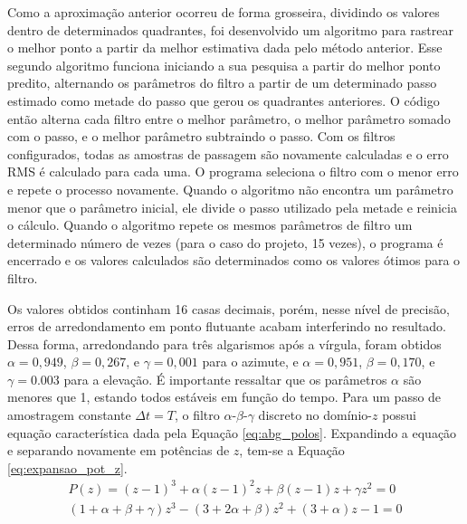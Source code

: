 Como a aproximação anterior ocorreu de forma grosseira, dividindo os valores dentro de determinados quadrantes, foi desenvolvido um algoritmo para rastrear o melhor ponto a partir da melhor estimativa dada pelo método anterior.
Esse segundo algoritmo funciona iniciando a sua pesquisa a partir do melhor ponto predito, alternando os parâmetros do filtro a partir de um determinado passo estimado como metade do passo que gerou os quadrantes anteriores.
O código então alterna cada filtro entre o melhor parâmetro, o melhor parâmetro somado com o passo, e o melhor parâmetro subtraindo o passo.
Com os filtros configurados, todas as amostras de passagem são novamente calculadas e o erro RMS é calculado para cada uma.
O programa seleciona o filtro com o menor erro e repete o processo novamente. Quando o algoritmo não encontra um parâmetro menor que o parâmetro inicial, ele divide o passo utilizado pela metade e reinicia o cálculo.
Quando o algoritmo repete os mesmos parâmetros de filtro um determinado número de vezes (para o caso do projeto, 15 vezes), o programa é encerrado e os valores calculados são determinados como os valores ótimos para o filtro.

Os valores obtidos continham 16 casas decimais, porém, nesse nível de precisão, erros de arredondamento em ponto flutuante acabam interferindo no resultado.
Dessa forma, arredondando para três algarismos após a vírgula, foram obtidos $\alpha = 0{,}949$, $\beta = 0{,}267$, e $\gamma = 0,001$ para o azimute, e $\alpha = 0{,}951$, $\beta = 0{,}170$, e $\gamma = 0.003$ para a elevação.
É importante ressaltar que os parâmetros $\alpha$ são menores que 1, estando todos estáveis em função do tempo. Para um passo de amostragem constante $\Delta t = T$, o filtro $\alpha$-$\beta$-$\gamma$ discreto no domínio-$z$ possui equação característica dada pela Equação \ref{eq:abg_polos}.
Expandindo a equação e separando novamente em potências de $z$, tem-se a Equação \ref{eq:expansao_pot_z}.
\begin{align}
    P(z) = (z - 1)^3 + \alpha(z - 1)^2 z + \beta(z - 1)z + \gamma z^2 = 0 \label{eq:abg_polos} \\
    (1 + \alpha + \beta + \gamma)z^3 - (3 + 2\alpha + \beta)z^2 + (3 + \alpha)z - 1 = 0 \label{eq:expansao_pot_z}
\end{align}

